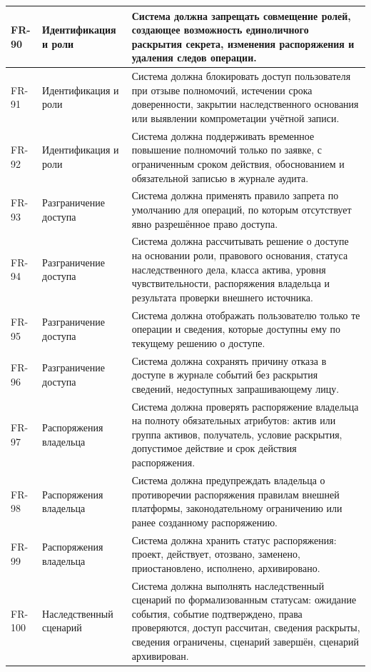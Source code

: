 \begin{longtable}{|P{1.45cm}|P{3.35cm}|P{10.7cm}|}
FR-90 & Идентификация и роли & Система должна запрещать совмещение ролей, создающее возможность единоличного раскрытия секрета, изменения распоряжения и удаления следов операции.\\ \hline
FR-91 & Идентификация и роли & Система должна блокировать доступ пользователя при отзыве полномочий, истечении срока доверенности, закрытии наследственного основания или выявлении компрометации учётной записи.\\ \hline
FR-92 & Идентификация и роли & Система должна поддерживать временное повышение полномочий только по заявке, с ограниченным сроком действия, обоснованием и обязательной записью в журнале аудита.\\ \hline
FR-93 & Разграничение доступа & Система должна применять правило запрета по умолчанию для операций, по которым отсутствует явно разрешённое право доступа.\\ \hline
FR-94 & Разграничение доступа & Система должна рассчитывать решение о доступе на основании роли, правового основания, статуса наследственного дела, класса актива, уровня чувствительности, распоряжения владельца и результата проверки внешнего источника.\\ \hline
FR-95 & Разграничение доступа & Система должна отображать пользователю только те операции и сведения, которые доступны ему по текущему решению о доступе.\\ \hline
FR-96 & Разграничение доступа & Система должна сохранять причину отказа в доступе в журнале событий без раскрытия сведений, недоступных запрашивающему лицу.\\ \hline
FR-97 & Распоряжения владельца & Система должна проверять распоряжение владельца на полноту обязательных атрибутов: актив или группа активов, получатель, условие раскрытия, допустимое действие и срок действия распоряжения.\\ \hline
FR-98 & Распоряжения владельца & Система должна предупреждать владельца о противоречии распоряжения правилам внешней платформы, законодательному ограничению или ранее созданному распоряжению.\\ \hline
FR-99 & Распоряжения владельца & Система должна хранить статус распоряжения: проект, действует, отозвано, заменено, приостановлено, исполнено, архивировано.\\ \hline
FR-100 & Наследственный сценарий & Система должна выполнять наследственный сценарий по формализованным статусам: ожидание события, событие подтверждено, права проверяются, доступ рассчитан, сведения раскрыты, сведения ограничены, сценарий завершён, сценарий архивирован.\\ \hline

\end{longtable}
